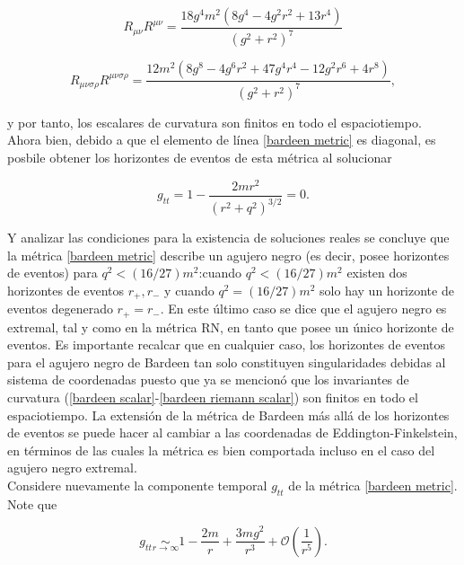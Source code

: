 \documentclass{article}
\numberwithin{equation}{section}
\begin{document}
\begin{equation}
\label{bardeen ricci scalar}
R_{\mu \nu}R^{\mu \nu} = \frac{18 g^4 m^2 \left(8 g^4-4 g^2 r^2+13 r^4\right)}{\left(g^2+r^2\right)^7}
\end{equation}

\begin{equation}
\label{bardeen riemann scalar}
R_{\mu \nu \sigma \rho}R^{\mu \nu \sigma \rho} = \frac{12 m^2 \left(8 g^8-4 g^6 r^2+47 g^4 r^4-12 g^2 r^6+4 r^8\right)}{\left(g^2+r^2\right)^7},
\end{equation}

y por tanto, los escalares de curvatura son finitos en todo el espaciotiempo.\\

Ahora bien, debido a que el elemento de línea \eqref{bardeen metric} es diagonal, es posbile obtener los horizontes de eventos de esta métrica al solucionar

\begin{equation}
g_{tt} = 1 - \frac{2mr^2}{(r^2 + q^2)^{3/2}} = 0.
\end{equation}

Y analizar las condiciones para la existencia de soluciones reales se concluye que la métrica \eqref{bardeen metric} describe un agujero negro (es decir, posee horizontes de eventos) para $q^2 < (16/27)m^2$:cuando $q^2 < (16/27)m^2$ existen dos horizontes de eventos $r_{+},r_{-}$ y cuando $q^2 = (16/27)m^2$ solo hay un horizonte de eventos degenerado $r_{+} = r_{-}$. En este último caso se dice que el agujero negro es extremal, tal y como en la métrica RN, en tanto que posee un único horizonte de eventos. Es importante recalcar que en cualquier caso, los horizontes de eventos para el agujero negro de Bardeen tan solo constituyen singularidades debidas al sistema de coordenadas puesto que ya se mencionó que los invariantes de curvatura (\ref{bardeen scalar}-\ref{bardeen riemann scalar}) son finitos en todo el espaciotiempo. La extensión de la métrica de Bardeen más allá de los horizontes de eventos se puede hacer al cambiar a las coordenadas de Eddington-Finkelstein, en términos de las cuales la métrica es bien comportada incluso en el caso del agujero negro extremal. \\

Considere nuevamente la componente temporal $g_{tt}$ de la métrica \eqref{bardeen metric}. Note que

\begin{equation}
g_{tt} \underset{r \to \infty}{\sim} 1 - \frac{2m}{r} + \frac{3mg^2}{r^3} + \mathcal{O}\left( \frac{1}{r^5} \right).
\end{equation}
\end{document}
